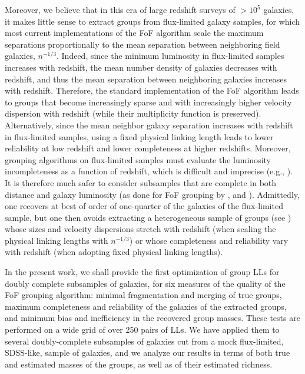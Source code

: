 Moreover, we believe that in this era of large  redshift surveys of $>10^5$
galaxies, it makes little sense to extract groups from flux-limited galaxy
samples, for which most current implementations of the FoF algorithm scale the
maximum separations proportionally to the mean  separation between neighboring
field galaxies, $n^{-1/3}$. Indeed, since the minimum luminosity in
flux-limited samples increases with redshift,  the mean number density of
galaxies decreases with redshift, and thus the mean separation between
neighboring galaxies increases with redshift. Therefore, the standard
implementation of the FoF algorithm leads to groups that become increasingly
sparse and with increasingly higher velocity dispersion with redshift (while
their multiplicity function is preserved). Alternatively, since the mean
neighbor galaxy separation increases with redshift in flux-limited samples,
using a fixed physical linking length leads to lower reliability at low
redshift and lower completeness at higher redshifts. Moreover, grouping
algorithms on flux-limited samples must evaluate the luminosity incompleteness
as a function of redshift, which is difficult and imprecise (e.g.,
\citealp{Marinoni+02,Yang+07}). It is therefore much safer to consider subsamples
that are complete in both distance and galaxy luminosity (as done for FoF
grouping by \citealp{Berlind+06}, \citealp{Tago+10} and \citealp{Tempel+14}).
Admittedly, one recovers at best of order of one-quarter of the galaxies of the
flux-limited sample, but one then avoids extracting a heterogeneous sample of
groups (see \citealp{Tempel+14}) whose sizes and velocity dispersions stretch
with redshift (when scaling the physical linking lengths with $n^{-1/3}$) or
whose completeness and reliability vary with redshift (when adopting fixed
physical linking lengths).

In the present work, we shall provide the first optimization of group LLs for
doubly complete subsamples of galaxies, for six measures of the quality of the
FoF grouping algorithm: minimal fragmentation and merging of true groups,
maximum completeness and reliability of the galaxies of the extracted groups,
and minimum bias and inefficiency in the recovered group masses. These tests
are performed on a wide grid of over 250 pairs of LLs. We have applied them to
several doubly-complete subsamples of galaxies cut from a mock flux-limited,
SDSS-like,  sample of galaxies, and we analyze our results in terms of both
true and estimated masses of the groups, as well as of their estimated
richness.

